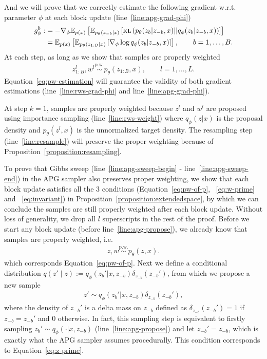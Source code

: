 \documentclass{article}
\theoremstyle{definition}
\newcommand{\given}{\lvert}
\newcommand{\pw}{\overset{\text{p.w.}}{\sim}
}
\begin{document}
And we will prove that we correctly estimate the following gradient w.r.t. parameter $\phi$ at each block update (line~\ref{line:apg-grad-phi}) 
\begin{align}
    g_\phi^b 
    :&= - \nabla_\phi \E_{p(x)}\left[ \E_{p_\theta(z_{-b} \given x)}\left[\textsc{kl}\left(p_\theta(z_b \given z_{-b}, x) || q_\phi(z_b \given z_{-b}, x)\right)\right]
    \right]
    \\
    &= 
    \E_{p(x)}\left[
    \E_{p_\theta(z_{1:B} \given x)}\left[\nabla_\phi \log q_\phi(z_b \given z_{-b}, x)\right]
    \right], \qquad b = 1, \ldots, B
    . \label{eq:g-phi-b}
\end{align}
At each step, as long as we show that samples are properly weighted
\begin{align}
    z_{1:B}^l, w^l \pw p_\theta(z_{1:B}, x), \qquad l = 1, \ldots, L.
    \label{eq:invariant}
\end{align}
Equation~\ref{eq:pw-estimation} will guarantee the validity of both gradient estimations (line~\ref{line:rws-grad-phi} and line~\ref{line:apg-grad-phi}).

At step $k=1$, samples are properly weighted because $z^l$ and $w^l$ are proposed using importance sampling (line~\ref{line:rws-weight}) where $q_\phi(z \given x)$ is the proposal density and $p_\theta(z^l, x)$ is the unnormalized target density. The resampling step (line~\ref{line:resample}) will preserve the proper weighting because of  Proposition~\ref{proposition:resampling}.

To prove that Gibbs sweep (line~\ref{line:apg-sweep-begin} - line~\ref{line:apg-sweep-end}) in the APG sampler also preserves proper weighting, we show that each block update satisfies all the 3 conditions (Equation~\ref{eq:pw-of-p}, ~\ref{eq:w-prime} and ~\ref{eq:invariant}) in Proposition~\ref{proposition:extendedspace}, by which we can conclude the samples are still properly weighted after each block update. Without loss of generality, we drop all $l$ superscripts in the rest of the proof. Before we start any block update (before line~\ref{line:apg-propose}),  we already know that samples are properly weighted, i.e.
\begin{align}
    z, w \pw p_\theta(z, x).
\end{align}
which corresponds Equation~\ref{eq:pw-of-p}. Next we define a conditional distribution $q(z' \mid z):= q_\phi(z_b' \given x, z_{-b}) \delta_{z_{-b}}(z_{-b}')$, from which we propose a new sample
\begin{align}
    z' \sim q_\phi(z_b' \given x, z_{-b}) \delta_{z_{-b}}(z_{-b}'),
\end{align}
where the density of $z_{-b}'$ is a delta mass on $z_{-b}$ defined as $\delta_{z_{-b}}(z_{-b}') = 1$ if $z_{-b} = z_{-b}'$ and $0$ otherwise.
In fact, this sampling step is equivalent to firstly sampling $z_b' \sim q_\phi(\cdot \given x, z_{-b})$ (line~\ref{line:apg-propose}) and let $z_{-b}' = z_{-b}$, which is exactly what the APG sampler assumes procedurally. This condition corresponds to Equation~\ref{eq:z-prime}.
\end{document}
